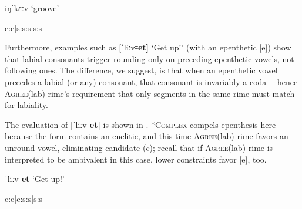 \documentclass[output=paper,colorlinks,citecolor=brown]{langscibook}
\begin{document}
\begin{table}
\caption{iŋˈkɛːv `groove'}
\label{groove}
\begin{center}
\ShadingOn
\begin{tableau}{c:c|s:s:s|s:s} 
      \const*{\rotatebox{90}{\textsc{*C[+son]]$_\sigma$}}}       
     \vio{}     \vio{}  \vio{*}    \vio{}                                    \vio{}     \vio{}  \vio{*}
              \vio{}     \vio{*!}  \vio{}    \vio{}                                      \vio{}     \vio{*}  \vio{**}
\end{tableau}
\end{center}
\end{table}

Furthermore, examples such as [ˈliːv꞊\textbf{et]} `Get up!' (with an epenthetic [e]) show that labial consonants trigger rounding only on preceding epenthetic vowels, not following ones.  The difference, we suggest, is that when an epenthetic vowel precedes a labial (or any) consonant, that consonant is invariably a coda~-- hence \textsc{Agree}(lab)-rime's requirement that only segments in the same rime must match for labiality.

The evaluation of [ˈliːv꞊\textbf{et]} is shown in .  \textsc{*Complex} compels epenthesis here because the form contains an enclitic, and this time \textsc{Agree}(lab)-rime favors an unround vowel, eliminating candidate (c); recall that if \textsc{Agree}(lab)-rime is interpreted to be ambivalent in this case, lower constraints favor [e], too.

\begin{table}
\caption{ˈliːv꞊\textbf{et} `Get up!'}
\label{getup}
\begin{center}
\ShadingOn
\begin{tableau}{c:c|c:s:s|s:s} 
      \const*{\rotatebox{90}{\textsc{*C[+son]]$_\sigma$}}}       
                \vio{*!}     \vio{}  \vio{}                                       \vio{}   \vio{}     \vio{}  \vio{*}
     \vio{}     \vio{}  \vio{}                                      \vio{}   \vio{}     \vio{}  \vio{*}
                \vio{}     \vio{}  \vio{*!}                                      \vio{}   \vio{}     \vio{*}  \vio{**}
\end{tableau}
\end{center}
\end{table}
\end{document}
